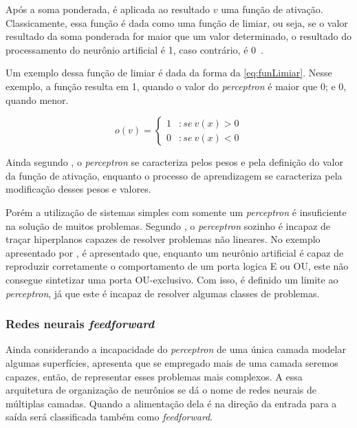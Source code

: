 \documentclass[
    12pt,
    oneside,
    a4paper,
    english,
    brazil
]{abntex2}
\begin{document}
Após a soma  ponderada, é  aplicada ao  resultado $v$  uma função  de ativação.
Classicamente, essa função é dada como uma função de limiar, ou seja, se o valor
resultado da soma  ponderada for maior que um valor determinado, o resultado do
processamento do neurônio artificial é 1, caso contrário, é 0~\cite{knight}.

Um exemplo  dessa função de limiar  é dada da forma  da \autoref{eq:funLimiar}.
Nesse exemplo, a função resulta em 1, quando o valor do \textit{perceptron} é 
maior que 0; e 0, quando menor.

\begin{equation}
    \label{eq:funLimiar}
    o(v) = \left\{
        \begin{array}{lr}
            1 & :se\  v(x) > 0\\
            0 & :se\  v(x) < 0
        \end{array}
    \right.
\end{equation}

Ainda segundo , o  \textit{perceptron} se  caracteriza pelos
pesos  e pela  definição  do valor  da  função  de ativação,  enquanto o 
processo de aprendizagem se caracteriza pela modificação desses pesos e valores.

Porém a  utilização de  sistemas simples com  somente um  \textit{perceptron} é
insuficiente na solução de muitos problemas. Segundo , o \textit{perceptron}
sozinho  é incapaz  de traçar  hiperplanos  capazes de  resolver problemas  não
lineares. No  exemplo apresentado  por ,  é apresentado
que,  enquanto um  neurônio  artificial  é capaz  de  reproduzir corretamente  o
comportamento de um porta logica E ou OU, este não consegue sintetizar uma porta
OU-exclusivo. Com isso, é definido um limite ao \textit{perceptron}, já que este
é incapaz de resolver algumas classes de problemas.

\subsubsection{Redes neurais \textit{feedforward}}

Ainda considerando  a incapacidade do  \textit{perceptron} de uma  única camada
modelar algumas superfícies,  apresenta que se empregado mais
de  uma  camada seremos  capazes, então,  de  representar esses  problemas  mais
complexos. A essa arquitetura de organização de neurônios se dá o nome de redes
neurais de  múltiplas camadas. Quando a alimentação dela é na  direção da entrada
para a saída será classificada também como \textit{feedforward}.
\end{document}
